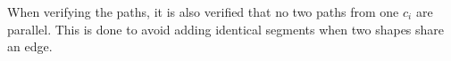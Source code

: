 When verifying the paths, it is also verified that no two paths from one $c_i$ are parallel. This is done to avoid adding identical segments when two shapes share an edge.




















